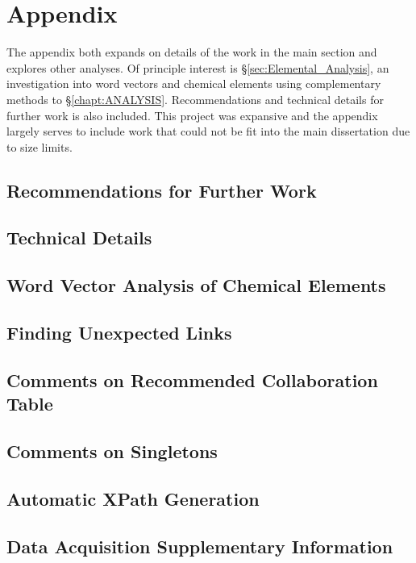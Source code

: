 \chapter{Appendix}
\vspace{-1cm}
\label{chapt:appendix}
The appendix both expands on details of the work in the main section and explores other analyses. Of principle interest is \S\ref{sec:Elemental_Analysis}, an investigation into word vectors and chemical elements using complementary methods to \S\ref{chapt:ANALYSIS}. Recommendations and technical details for further work is also included. This project was expansive and the appendix largely serves to include work that could not be fit into the main dissertation due to size limits.
\vspace{-.3cm}
\section{Recommendations for Further Work}

\newpage
\null
\newpage
\section{Technical Details}

\newpage
\section{Word Vector Analysis of Chemical Elements}

\newpage
\section{Finding Unexpected Links}

\newpage
\null
\newpage
\section{Comments on Recommended Collaboration Table}

\newpage
\null
\newpage
\section{Comments on Singletons}

\newpage
\null
\newpage
\section{Automatic XPath Generation}

\newpage
\section{Data Acquisition Supplementary Information}

